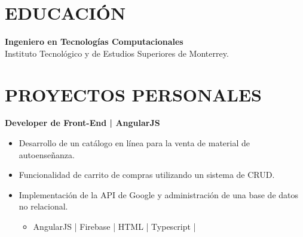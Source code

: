 \documentclass{res}
\begin{document}
\address{
}

\begin{resume}
    \separator

    \section{\large{EDUCACIÓN}} \vspace{1mm}
    \textbf{Ingeniero en Tecnologías Computacionales}
     \\
    Instituto Tecnológico y de Estudios Superiores de Monterrey.
    
    \vspace{5mm}

    \section{\large{PROYECTOS PERSONALES}} \vspace{1mm}
    \textbf{Developer de Front-End | AngularJS} \vspace{1mm}
    \begin{itemize}
        \item Desarrollo de un catálogo en línea para la venta de material de autoenseñanza.
        \item Funcionalidad de carrito de compras utilizando un sistema de CRUD.
        \item Implementación de la API de Google y administración de una base de datos no relacional.
        \begin{itemize}
            \item AngularJS | Firebase | HTML | Typescript |
        \end{itemize}
    \end{itemize}
\end{resume}
\end{document}
